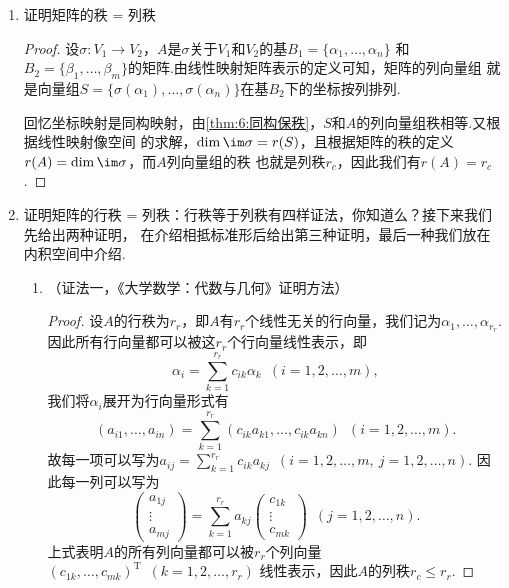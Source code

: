 \begin{enumerate}
    \item 证明矩阵的秩 = 列秩

    \begin{proof}
        设$\sigma:V_1\to V_2$，$A$是$\sigma$关于$V_1$和$V_2$的基$B_1=\{\alpha_1,\ldots,\alpha_n\}$
        和$B_2=\{\beta_1,\ldots,\beta_m\}$的矩阵.由线性映射矩阵表示的定义可知，矩阵的列向量组
        就是向量组$S=\{\sigma(\alpha_1),\ldots,\sigma(\alpha_n)\}$在基$B_2$下的坐标按列排列.

        回忆坐标映射是同构映射，由\autoref{thm:6:同构保秩}，$S$和$A$的列向量组秩相等.又根据线性映射像空间
        的求解，$\dim\im\sigma=r(S)$，且根据矩阵的秩的定义$r(A)=\dim\im\sigma$，而$A$列向量组的秩
        也就是列秩$r_c$，因此我们有$r(A)=r_c$.
    \end{proof}

    \item 证明矩阵的行秩 = 列秩：行秩等于列秩有四样证法，你知道么？接下来我们先给出两种证明，
    在介绍相抵标准形后给出第三种证明，最后一种我们放在内积空间中介绍.
    \begin{enumerate}[label=(\arabic*)]
        \item （证法一，《大学数学：代数与几何》证明方法）

        \begin{proof}
            设$A$的行秩为$r_r$，即$A$有$r_r$个线性无关的行向量，我们记为$\alpha_1,\ldots,\alpha_{r_r}$.
            因此所有行向量都可以被这$r_r$个行向量线性表示，即
            \[\alpha_i=\sum\limits_{k=1}^{r_r}c_{ik}\alpha_k\enspace(i=1,2,\ldots,m),\]
            我们将$\alpha_i$展开为行向量形式有
            \[(a_{i1},\ldots,a_{in})=\sum\limits_{k=1}^{r_r}(c_{ik}a_{k1},\ldots,c_{ik}a_{kn})\enspace(i=1,2,\ldots,m).\]
            故每一项可以写为$a_{ij}=\sum\limits_{k=1}^{r_r}c_{ik}a_{kj}\enspace(i=1,2,\ldots,m,\ j=1,2,\ldots,n)$.
            因此每一列可以写为
            \[\begin{pmatrix}
                a_{1j} \\ \vdots \\ a_{mj}
            \end{pmatrix}=\sum\limits_{k=1}^{r_r}a_{kj}\begin{pmatrix}
                c_{1k} \\ \vdots \\ c_{mk}
            \end{pmatrix}\enspace(j=1,2,\ldots,n).\]
            上式表明$A$的所有列向量都可以被$r_r$个列向量$(c_{1k},\ldots,c_{mk})^\mathrm{T}\enspace(k=1,2,\ldots,r_r)$
            线性表示，因此$A$的列秩$r_c\leqslant r_r$.


\end{proof}
\end{enumerate}
\end{enumerate}
